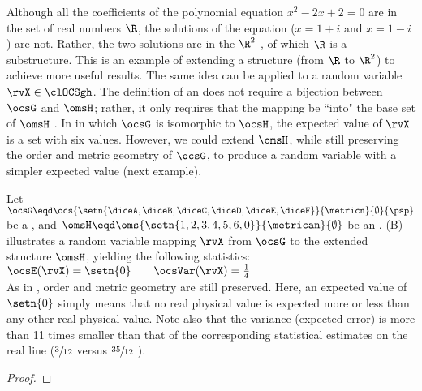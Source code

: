 \begin{tabstr}{0.75}
Although all the coefficients of the polynomial equation $x^2-2x+2=0$ are in the set of real numbers $\R$,
the solutions of the equation ($x=1+i$ and $x=1-i$) are not. 
Rather, the two solutions are in the  $\R^2$ , of which $\R$ is a substructure.
This is an example of extending a structure (from $\R$ to $\R^2$) to achieve more useful results.
The same idea can be applied to a random variable $\rvX\in\clOCSgh$.
The definition of an   does not require a bijection
between $\ocsG$ and $\omsH$;
rather, it only requires that the mapping be ``into" the base set of $\omsH$ .
In  in which $\ocsG$ is isomorphic to $\ocsH$, 
the expected value of $\rvX$ is a set with six values.
However, we could extend $\omsH$, while still preserving the order and metric geometry of $\ocsG$,
to produce a random variable with a simpler expected value (next example). 
\\
\begin{example}
\label{ex:fdieXO6c}
Let $\ocsG\eqd\ocs{\setn{\diceA,\diceB,\diceC,\diceD,\diceE,\diceF}}{\metricn}{\emptyset}{\psp}$ 
be a  ,
and $\omsH\eqd\oms{\setn{1,2,3,4,5,6,0}}{\metrican}{\emptyset}$ 
be an  .
 (B) illustrates a random variable mapping $\rvX$ from $\ocsG$ to the extended structure $\omsH$,
yielding the following statistics:
\\\indentx$\ocsE(\rvX) = \setn{0} \qquad \ocsVar(\rvX)  = \frac{1}{4}$\\
As in , order and metric geometry are still preserved.
Here, an expected value of $\setn{0}$ simply means that no real physical value is expected 
more or less than any other real physical value.
Note also that the variance (expected error) is more than 11 times smaller than that of 
the corresponding statistical estimates on the real line 
($\sfrac{3}{12}$ versus $\sfrac{35}{12}$ ).
\end{example}
\begin{proof}

\end{proof}
\end{tabstr}
